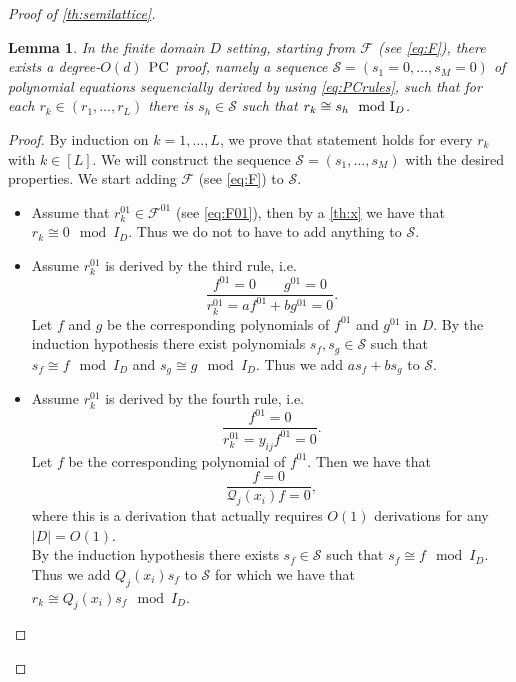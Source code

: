 \documentclass[11pt]{article}
\newcommand{\F}{\mathcal{F}}
\newcommand{\PC}{\textsc{PC}}
\newcommand{\I}{\emph{$\rm{I}$}}
\newcommand{\1}{\textbf{1}}
\newcommand\q{\mathcal{Q}}
\newtheorem{lemma}[theorem]{Lemma}
\begin{document}
\begin{proof} [Proof of \cref{th:semilattice}]
\begin{lemma}\label{th:PC_proof_semilattice}
        In the finite domain $D$ setting, starting from $\F$ (see \cref{eq:F}), there exists a degree-$O(d)$ $\PC$ proof, namely a sequence $\mathcal{S} = (s_1=0,\ldots,s_M=0)$ of polynomial equations sequencially derived by using \eqref{eq:PCrules}, such that for each $r_k\in (r_1,\ldots,r_L)$ there is $s_h\in \mathcal{S}$ such that $r_k \cong s_h \mod{\I_D}$.
    \end{lemma}
    
    \begin{proof}
        By induction on $k=1,\ldots,L$, we prove that statement holds for every $r_k$ with $k\in[L]$. We will construct the sequence $\mathcal{S} = (s_1, \dots, s_M)$ with the desired properties. We start adding $\mathcal{F}$ (see \cref{eq:F}) to $\mathcal{S}$.\\
        \begin{itemize}
            \item Assume that $r^{01}_k\in \F^{01}$ (see \cref{eq:F01}), then by a \cref{th:x} we have that $r_k \cong 0 \mod{I_D}$. Thus we do not to have to add anything to $\mathcal{S}$.
            \item Assume $r_k^{01}$ is derived by the third rule, i.e.
                \begin{equation}
                    \frac{f^{01}=0 \qquad g^{01}=0}{r_k^{01}=a f^{01} + b g^{01} =0}. 
                \end{equation}
                Let $f$ and $g$ be the corresponding polynomials of $f^ {01}$ and $g^{01}$ in $D$. By the induction hypothesis there exist polynomials $s_f, s_g \in \mathcal{S}$ such that $s_f \cong f \mod{I_D}$ and $s_g \cong g \mod{I_D}$. Thus we add $a s_f + b s_g$ to $\mathcal{S}$.
            \item Assume $r_k^{01}$ is derived by the fourth rule, i.e.
                \begin{equation*}%
                    \frac{f^{01}=0}{r_k^{01}=y_{ij}f^{01}=0}. 
                \end{equation*}
                Let $f$ be the corresponding polynomial of $f^{01}$. Then we have that 
                \begin{equation*}%
                    \frac{f=0}{\q_j(x_i)f=0},
                \end{equation*}
                where this is a derivation that actually requires $O(1)$ derivations for any $|D| = O(1)$.\\
                By the induction hypothesis there exists $s_f \in \mathcal{S}$ such that $s_f \cong f \mod{I_D}$. Thus we add $Q_j(x_i)s_f$ to $\mathcal{S}$ for which we have that $r_k \cong Q_j(x_i)s_f \mod{I_D}$.
            \end{itemize}
    \end{proof}
    

\end{proof}
\end{document}
